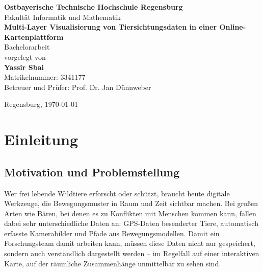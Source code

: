 \documentclass[12pt,a4paper]{report}
\begin{document}
\begin{titlepage}
    \centering
    \vspace*{2cm}

    {\LARGE\bfseries Ostbayerische Technische Hochschule Regensburg}\\[0.5cm]
    {\Large Fakultät Informatik und Mathematik}\\[3cm]

    {\huge\bfseries Multi-Layer Visualisierung von Tiersichtungsdaten in einer Online-Kartenplattform}\\[3cm]

    {\Large Bachelorarbeit}\\[1cm]

    vorgelegt von\\[0.5cm]
    {\Large\bfseries Yassir Sbai}\\[0.3cm]
    Matrikelnummer: 3341177\\[3cm]

    Betreuer und Prüfer: Prof. Dr. Jan Dünnweber\\


    \vfill

    Regensburg, \today
\end{titlepage}

\tableofcontents
\newpage

\chapter{Einleitung}
\label{chap:einleitung}

\section{Motivation und Problemstellung}
\label{sec:motivation}

Wer frei lebende Wildtiere erforscht oder schützt, braucht heute digitale Werkzeuge, die
Bewegungsmuster in Raum und Zeit sichtbar machen. Bei großen Arten wie Bären, bei denen es
zu Konflikten mit Menschen kommen kann, fallen dabei sehr unterschiedliche Daten an:
GPS-Daten besenderter Tiere, automatisch erfasste Kamerabilder und Pfade aus
Bewegungsmodellen. Damit ein Forschungsteam damit arbeiten kann, müssen diese Daten nicht
nur gespeichert, sondern auch verständlich dargestellt werden -- im Regelfall auf einer
interaktiven Karte, auf der räumliche Zusammenhänge unmittelbar zu sehen sind.
\end{document}
